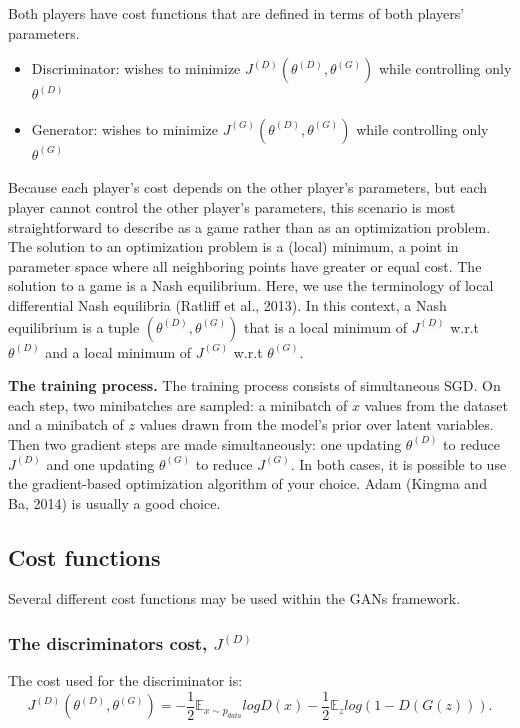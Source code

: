 \documentclass{scrartcl}
\begin{document}
Both players have cost functions that are defined in terms of both players’ parameters.
\begin{itemize}
	\item
		Discriminator: wishes to minimize $J^{(D)}(\theta^{(D)},\theta^{(G)})$ while controlling only $\theta^{(D)}$
	\item
		Generator: wishes to minimize $J^{(G)}(\theta^{(D)},\theta^{(G)})$ while controlling only $\theta^{(G)}$
\end{itemize}


Because each player's cost depends on the other player’s parameters, but each player cannot control the other player’s parameters, this scenario is most straightforward to describe as a game rather than as an optimization problem. The solution to an optimization problem is a (local) minimum, a point in parameter space where all neighboring points have greater or equal cost. The solution to a game is a Nash equilibrium. Here, we use the terminology of local differential Nash equilibria
(Ratliff et al., 2013). In this context, a Nash equilibrium is a tuple $(\theta^{(D)},\theta^{(G)})$ that is a local minimum of $J^{(D)}$ w.r.t $\theta^{(D)}$ and a local minimum of $J^{(G)}$ w.r.t $\theta^{(G)}$.

\textbf{The training process.} The training process consists of simultaneous SGD. On each step, two minibatches are sampled: a minibatch of $x$ values from the
dataset and a minibatch of $z$ values drawn from the model’s prior over latent
variables. Then two gradient steps are made simultaneously: one updating $\theta^{(D)}$ to reduce $J^{(D)}$ and one updating $\theta^{(G)}$ to reduce $J^{(G)}$. In both cases, it is possible to use the gradient-based optimization algorithm of your choice. Adam (Kingma and Ba, 2014) is usually a good choice.

\subsection{Cost functions}
Several different cost functions may be used within the GANs framework.

\subsubsection{The discriminators cost, $J^{(D)}$}
The cost used for the discriminator is:
$$J^{(D)}(\theta^{(D)},\theta^{(G)}) = -\frac{1}{2} \mathbb{E}_{x \sim{} p_{data}} log D(x) - \frac{1}{2} \mathbb{E}_z log(1 - D(G(z))).$$
\end{document}
